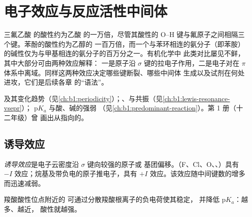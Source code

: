 \chapter{电子效应与反应活性中间体}\label{ch:b1:electronic-effects}

三氟乙酸  的酸性约为乙酸
 的一万倍，尽管其酸性的
O--H 键与氟原子之间相隔三个键。苯酚的酸性约为乙醇的
一百万倍，而一个与苯环相连的氨分子（即苯胺）
的碱性仅为与甲基相连的氨分子的百万分之一。有机化学中
此类对比屡见不鲜，其中大部分可由两种效应解释：
一是原子沿
$\sigma$ 键的拉电子作用，二是电子对在 $\pi$
体系中离域。同样这两种效应决定哪些键断裂、哪些中间体
生成以及试剂在何处进攻，它们是后续各章
的“语法”。

\begin{recall}
及其变化趋势（见\cref{ch:b1:periodicity}）；、与共振（见\cref{ch:b1:lewis-resonance-vsepr}）；
$\mathrm{p}K_a$ 与酸、碱的强弱
（见\cref{ch:b1:predominant-reaction}）。第 1 册（十二年级）曾
画出从指向的。
\end{recall}

\section{诱导效应}

\begin{definition}[诱导效应]\label{def:b1:electronic-effects:inductive}
\emph{诱导效应}是电子云密度沿
$\sigma$ 键向较强的原子或
基团偏移。（F、Cl、O、、）具有 $-I$
效应；烷基及带负电的原子推电子，具有 $+I$
效应。该效应随中间键数的增多而迅速减弱。
\end{definition}

\begin{proposition}[诱导效应与酸性]\label{prop:b1:electronic-effects:inductive-pka}
羧酸酸性位点附近的
可通过分散羧酸根离子的负电荷使其稳定，
并降低 $\mathrm{p}K_a$：越多、越近，
酸性就越强。
\end{proposition}

